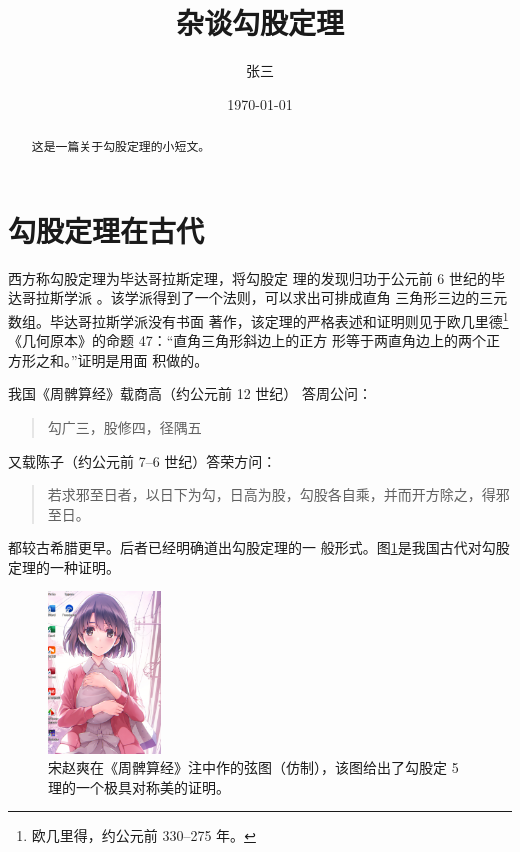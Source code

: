 \documentclass[UTF8]{ctexart}
\title{\heiti 杂谈勾股定理}
\author{\kaishu 张三}
\date{\today}
\newenvironment{myquote}{\begin{quote}\kaishu\zihao{-5}}
{\end{quote}}
\begin{document}
    \maketitle
    \begin{abstract}
        这是一篇关于勾股定理的小短文。
    \end{abstract}
    \tableofcontents

    \section{勾股定理在古代}
    西方称勾股定理为毕达哥拉斯定理，将勾股定
理的发现归功于公元前 6 世纪的毕达哥拉斯学派
\cite{Kline}。该学派得到了一个法则，可以求出可排成直角
三角形三边的三元数组。毕达哥拉斯学派没有书面
	著作，该定理的严格表述和证明则见于欧几里德\footnote{欧几里得，约公元前 330--275 年。}
《几何原本》的命题 47：“直角三角形斜边上的正方
形等于两直角边上的两个正方形之和。”证明是用面
积做的。

我国《周髀算经》载商高（约公元前 12 世纪）
答周公问：
    \begin{myquote}
	    勾广三，股修四，径隅五
    \end{myquote}
又载陈子（约公元前 7--6 世纪）答荣方问：
\begin{myquote}
	若求邪至日者，以日下为勾，日高为股，勾股各自乘，并而开方除之，得邪至日。
\end{myquote}
都较古希腊更早。后者已经明确道出勾股定理的一
般形式。图\ref{fig:xiantu}是我国古代对勾股定理的一种证明\cite{quanjing}。
\begin{figure}[ht]
    \centering
    \includegraphics[width=3cm]{xiantu.png}
    \caption{宋赵爽在《周髀算经》注中作的弦图（仿制），该图给出了勾股定
    5 理的一个极具对称美的证明。 }
    \label{fig:xiantu}
\end{figure}
\end{document}
